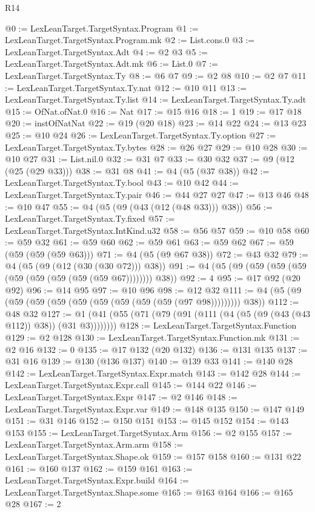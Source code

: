 \begin{lexlean}{R14}
\begin{coremodule}
@0 := LexLeanTarget.TargetSyntax.Program
@1 := LexLeanTarget.TargetSyntax.Program.mk
@2 := List.cons.{0}
@3 := LexLeanTarget.TargetSyntax.Adt
@4 := @2 @3
@5 := LexLeanTarget.TargetSyntax.Adt.mk
@6 := List.{0}
@7 := LexLeanTarget.TargetSyntax.Ty
@8 := @6 @7
@9 := @2 @8
@10 := @2 @7
@11 := LexLeanTarget.TargetSyntax.Ty.nat
@12 := @10 @11
@13 := LexLeanTarget.TargetSyntax.Ty.list
@14 := LexLeanTarget.TargetSyntax.Ty.adt
@15 := OfNat.ofNat.{0}
@16 := Nat
@17 := @15 @16
@18 := 1
@19 := @17 @18
@20 := instOfNatNat
@22 := @19 (@20 @18)
@23 := @14 @22
@24 := @13 @23
@25 := @10 @24
@26 := LexLeanTarget.TargetSyntax.Ty.option
@27 := LexLeanTarget.TargetSyntax.Ty.bytes
@28 := @26 @27
@29 := @10 @28
@30 := @10 @27
@31 := List.nil.{0}
@32 := @31 @7
@33 := @30 @32
@37 := @9 (@12 (@25 (@29 @33)))
@38 := @31 @8
@41 := @4 (@5 (@37 @38))
@42 := LexLeanTarget.TargetSyntax.Ty.bool
@43 := @10 @42
@44 := LexLeanTarget.TargetSyntax.Ty.pair
@46 := @44 @27 @27
@47 := @13 @46
@48 := @10 @47
@55 := @4 (@5 (@9 (@43 (@12 (@48 @33))) @38))
@56 := LexLeanTarget.TargetSyntax.Ty.fixed
@57 := LexLeanTarget.TargetSyntax.IntKind.u32
@58 := @56 @57
@59 := @10 @58
@60 := @59 @32
@61 := @59 @60
@62 := @59 @61
@63 := @59 @62
@67 := @59 (@59 (@59 (@59 @63)))
@71 := @4 (@5 (@9 @67 @38))
@72 := @43 @32
@79 := @4 (@5 (@9 (@12 (@30 (@30 @72))) @38))
@91 := @4 (@5 (@9 (@59 (@59 (@59 (@59 (@59 (@59 (@59 (@59 @67)))))))) @38))
@92 := 4
@95 := @17 @92 (@20 @92)
@96 := @14 @95
@97 := @10 @96
@98 := @12 @32
@111 := @4 (@5 (@9 (@59 (@59 (@59 (@59 (@59 (@59 (@59 (@59 (@97 @98))))))))) @38))
@112 := @48 @32
@127 := @1 (@41 (@55 (@71 (@79 (@91 (@111 (@4 (@5 (@9 (@43 (@43 @112)) @38)) (@31 @3))))))))
@128 := LexLeanTarget.TargetSyntax.Function
@129 := @2 @128
@130 := LexLeanTarget.TargetSyntax.Function.mk
@131 := @2 @16
@132 := 0
@135 := @17 @132 (@20 @132)
@136 := @131 @135
@137 := @31 @16
@139 := @130 (@136 @137)
@140 := @139 @33
@141 := @140 @28
@142 := LexLeanTarget.TargetSyntax.Expr.match
@143 := @142 @28
@144 := LexLeanTarget.TargetSyntax.Expr.call
@145 := @144 @22
@146 := LexLeanTarget.TargetSyntax.Expr
@147 := @2 @146
@148 := LexLeanTarget.TargetSyntax.Expr.var
@149 := @148 @135
@150 := @147 @149
@151 := @31 @146
@152 := @150 @151
@153 := @145 @152
@154 := @143 @153
@155 := LexLeanTarget.TargetSyntax.Arm
@156 := @2 @155
@157 := LexLeanTarget.TargetSyntax.Arm.arm
@158 := LexLeanTarget.TargetSyntax.Shape.ok
@159 := @157 @158
@160 := @131 @22
@161 := @160 @137
@162 := @159 @161
@163 := LexLeanTarget.TargetSyntax.Expr.build
@164 := LexLeanTarget.TargetSyntax.Shape.some
@165 := @163 @164
@166 := @165 @28
@167 := 2

\end{coremodule}
\end{lexlean}
